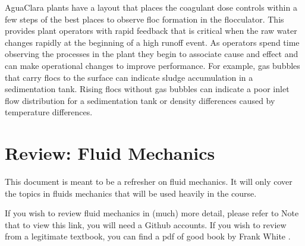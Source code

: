 \documentclass[letterpaper,10pt,english]{sphinxmanual}
\begin{document}
AguaClara plants have a layout that places the coagulant dose controls within a few steps of the best places to observe floc formation in the flocculator. This provides plant operators with rapid feedback that is critical when the raw water changes rapidly at the beginning of a high runoff event. As operators spend time observing the processes in the plant they begin to associate cause and effect and can make operational changes to improve performance. For example, gas bubbles that carry flocs to the surface can indicate sludge accumulation in a sedimentation tank. Rising flocs without gas bubbles can indicate a poor inlet flow distribution for a sedimentation tank or density differences caused by temperature differences.
\label{\detokenize{Introduction/Introduction:heading-comparison-with-croton-water-treatment-plant}}

\chapter{Review: Fluid Mechanics}
\label{\detokenize{Review/Review_Fluid_Mechanics:review-fluid-mechanics}}\label{\detokenize{Review/Review_Fluid_Mechanics:title-review-fluid-mechanics}}\label{\detokenize{Review/Review_Fluid_Mechanics::doc}}
This document is meant to be a refresher on fluid mechanics. It will only cover the topics in fluids mechanics that will be used heavily in the course.

If you wish to review fluid mechanics in (much) more detail, please refer to  Note that to view this link, you will need a Github accounts. If you wish to review from a legitimate textbook, you can find a pdf of good book by Frank White .
\end{document}
